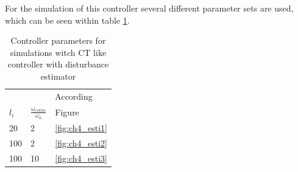 For the simulation of this controller several different parameter sets are used, which can be seen within table \ref{tab:ch5_distesti}.

\begin{table}[h]
	\begin{center}
		
		\label{tab:ch5_distesti}
		\begin{tabular}{lll}
			&                                   & According          \\
			$l_i$ & $\frac{\omega_{estim}}{\omega_n}$ & Figure             \\
			\midrule
			20    & 2                                 & \ref{fig:ch4_esti1} \\
			100   & 2                                 & \ref{fig:ch4_esti2} \\
			100   & 10                                & \ref{fig:ch4_esti3} \\
			\bottomrule
		\end{tabular}
	\caption{Controller parameters for simulations witch CT like controller with disturbance estimator}
	\end{center}
\end{table}

